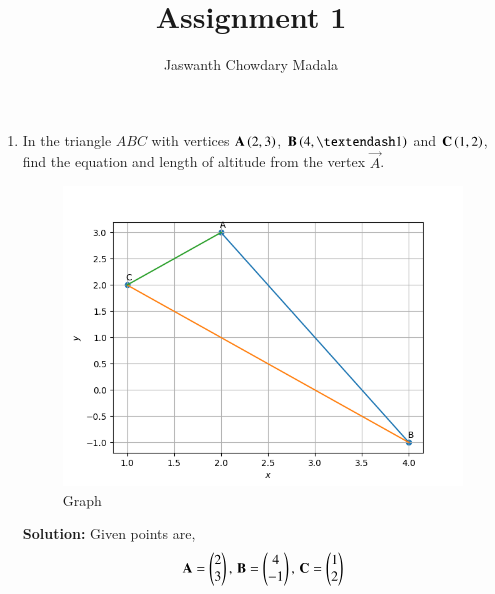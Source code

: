 \documentclass[journal,12pt,twocolumn]{IEEEtran}
\begin{document}
\vspace{3cm}


\title{Assignment 1}
\author{Jaswanth Chowdary Madala}





\maketitle

\newpage


\bigskip

\renewcommand{\thefigure}{\theenumi}
\renewcommand{\thetable}{\theenumi}


\begin{enumerate}

\item In the triangle $ABC$ with vertices $\mathbf{A} \left(2, 3\right)$, $\vec{B} \brak{4, –1}$ and $\mathbf{C} \left(1, 2\right)$, find the equation and length of altitude from the vertex $\vec{A}$.

\begin{figure}[ht]
\centering
\includegraphics[width = \columnwidth]{"./figs/fig.png"}
\caption{Graph}
\label{fig:1}
\end{figure}

\textbf{Solution:} Given points are,
\begin{align}
\mathbf{A} = \begin{pmatrix}2\\3\end{pmatrix},\, \mathbf{B} = \begin{pmatrix}4\\-1\end{pmatrix},\, \mathbf{C}= \begin{pmatrix}1\\2\end{pmatrix}
\end{align}


\end{enumerate}
\end{document}
